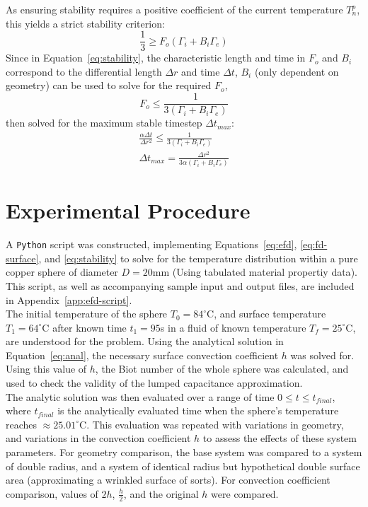 \documentclass[12pt]{article}
\begin{document}
As ensuring stability requires a positive coefficient of the current temperature $T_n^p$, this yields a strict stability criterion:
\begin{equation}
    \label{eq:stability}
    \frac{1}{3}\geq F_o(\Gamma_i + B_i\Gamma_e)
\end{equation}
Since in Equation~\ref{eq:stability}, the characteristic length and time in $F_o$ and $B_i$ correspond to the differential length $\Delta r$ and time $\Delta t$, $B_i$ (only dependent on geometry) can be used to solve for the required $F_o$,
\begin{equation}
   F_o \leq \frac{1}{3 (\Gamma_i + B_i\Gamma_e)} 
\end{equation}
then solved for the maximum stable timestep $\Delta t_{max}$:
\begin{gather*}
    \frac{\alpha \Delta t}{\Delta r^2}\leq \frac{1}{3 (\Gamma_i + B_i\Gamma_e)}\\
    \boxed{\Delta t_{max} = \frac{\Delta r^2}{3\alpha (\Gamma_i + B_i\Gamma_e)}}
\end{gather*}

\section{Experimental Procedure}\label{sec:methods}
\newcommand{\Python}{\texttt{Python}\xspace}
A \Python script was constructed, implementing Equations~\ref{eq:efd}, \ref{eq:fd-surface}, and \ref{eq:stability} to solve for the temperature distribution within a pure copper sphere of diameter $D=20$mm (Using tabulated material propertiy data\cite{bergman_fundamentals_2017}).
This script, as well as accompanying sample input and output files, are included in Appendix~\ref{app:efd-script}.\\

The initial temperature of the sphere $T_0=84^\circ$C, and surface temperature $T_1=64^\circ$C after known time $t_1=95$s in a fluid of known temperature $T_f=25^\circ$C, are understood for the problem.
Using the analytical solution in Equation~\ref{eq:anal}, the necessary surface convection coefficient $h$ was solved for.
Using this value of $h$, the Biot number of the whole sphere was calculated, and used to check the validity of the lumped capacitance approximation.\\

The analytic solution was then evaluated over a range of time $0\leq t \leq t_{final}$, where $t_{final}$ is the analytically evaluated time when the sphere's temperature reaches $\approx25.01^{\circ}$C.
This evaluation was repeated with variations in geometry, and variations in the convection coefficient $h$ to assess the effects of these system parameters.
For geometry comparison, the base system was compared to a system of double radius, and a system of identical radius but hypothetical double surface area (approximating a wrinkled surface of sorts).
For convection coefficient comparison, values of $2h$, $\frac{h}{2}$, and the original $h$ were compared.\\
\end{document}
